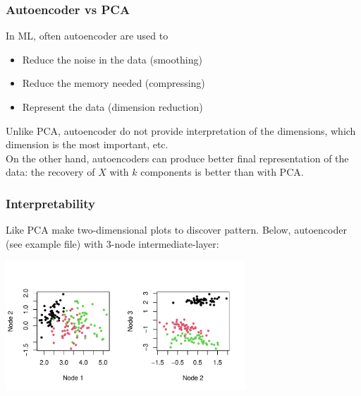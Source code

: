 \begin{frame}
\frametitle{Autoencoder vs PCA}
In ML, often autoencoder are used to 
\begin{itemize}
\item Reduce the noise in the data (smoothing)
\item Reduce the memory needed (compressing)
\item Represent the data (dimension reduction)
\end{itemize}
Unlike PCA, autoencoder do not provide interpretation of the dimensions, which dimension is the most important, etc.\\
\vspace{0.3cm}
On the other hand, autoencoders can produce better final representation of the data: the recovery of $X$ with $k$ components is better than with PCA.
\end{frame}
\begin{frame}
\frametitle{Interpretability}
Like PCA make two-dimensional plots to discover pattern. Below, autoencoder (see example file) with 3-node intermediate-layer:
\begin{center}
\includegraphics[width=9cm]{../../Graphs/Iris_AE_embed.pdf}
\end{center}
\end{frame}
